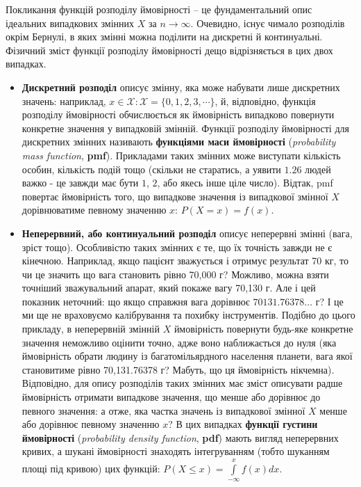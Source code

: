 \documentclass[
  11pt,
]{book}
\begin{document}
Покликання функцій розподілу ймовірності -- це фундаментальний опис ідеальних випадкових змінних \(X\) за \(n \rightarrow \infty\). Очевидно, існує чимало розподілів окрім Бернулі, в яких змінні можна поділити на дискретні й континуальні. Фізичний зміст функції розподілу ймовірності дещо відрізняється в цих двох випадках.

\begin{itemize}
\item
  \textbf{Дискретний розподіл} описує змінну, яка може набувати лише дискретних значень: наприклад, \(x \in \mathcal{X}: \mathcal{X} = \{0, 1, 2, 3, \cdots\}\), й, відповідно, функція розподілу ймовірності обчислюється як ймовірність випадково повернути конкретне значення у випадковій змінній. Функції розподілу ймовірності для дискретних змінних називають \textbf{функціями маси ймовірності} (\emph{probability mass function}, \textbf{pmf}). Прикладами таких змінних може виступати кількість особин, кількість подій тощо (скільки не старатись, а уявити \(1.26\) людей важко - це завжди має бути \(1\), \(2\), або якесь інше ціле число). Відтак, pmf повертає ймовірність того, що випадкове значення із випадкової змінної \(X\) дорівнюватиме певному значенню \(x\): \(P(X = x) = f(x)\).
\item
  \textbf{Неперервний, або континуальний розподіл} описує неперервні змінні (вага, зріст тощо). Особливістю таких змінних є те, що їх точність завжди не є кінечною. Наприклад, якщо пацієнт зважується і отримує результат 70 кг, то чи це значить що вага становить рівно 70,000 г? Можливо, можна взяти точніший зважувальний апарат, який покаже вагу 70,130 г. Але і цей показник неточний: що якщо справжня вага дорівнює \(70131.76378 \ldots\) г? І це ми ще не враховуємо калібрування та похибку інструментів. Подібно до цього прикладу, в неперервній змінній \(X\) ймовірність повернути будь-яке конкретне значення неможливо оцінити точно, адже воно наближається до нуля (яка ймовірність обрати людину із багатомільярдного населення планети, вага якої становитиме рівно 70,131.76378 г? Мабуть, що ця ймовірність нікчемна). Відповідно, для опису розподілів таких змінних має зміст описувати радше ймовірність отримати випадкове значення, що менше або дорівнює до певного значення: а отже, яка частка значень із випадкової змінної \(X\) менше або дорівнює певному значенню \(x\)? В цих випадках \textbf{функції густини ймовірності} (\emph{probability density function}, \textbf{pdf}) мають вигляд неперервних кривих, а шукані ймовірності знаходять інтегруванням (тобто шуканням площі під кривою) цих функцій: \(P(X \leq x) = \int \limits_{-\infty}^x f(x) dx\).
\end{itemize}
\end{document}
